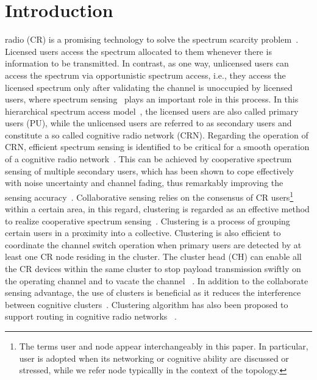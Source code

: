 \documentclass[10pt,journal,compsoc]{IEEEtran}
\theoremstyle{mytheoremstyle}
\theoremstyle{mytheoremstyle}
\theoremstyle{mytheoremstyle}
\newcommand{\ie}{i.e., }
\begin{document}
\section{Introduction}
\label{intro}
 radio (CR) is a promising technology to solve the spectrum scarcity problem~\cite{Mitola}.
Licensed users access the spectrum allocated to them whenever there is information to be transmitted.
In contrast, as one way, unlicensed users can access the spectrum via opportunistic spectrum access, \ie they access the licensed spectrum only after validating the channel is unoccupied by licensed users, where spectrum sensing~\cite{sensing_survey_2009} plays an important role in this process.
%
In this hierarchical spectrum access model~\cite{zhao_survey_DSA_2007}, the licensed users are also called primary users (PU), while the unlicensed users are referred to as secondary users and constitute a so called cognitive radio network (CRN).
%
Regarding the operation of CRN, efficient spectrum sensing is identified to be critical for a smooth operation of a cognitive radio network~\cite{Sahai_FundamentalDesignTradeoffs2006}.
This can be achieved by cooperative spectrum sensing of multiple secondary users, which has been shown to cope effectively with noise uncertainty and channel fading, thus remarkably improving the sensing accuracy~\cite{coorperativeSensing_Akyildiz11}.
Collaborative sensing relies on the consensus of CR users\footnote{The terms user and node appear interchangeably in this paper. In particular, user is adopted when its networking or cognitive ability are discussed or stressed, while we refer node typicallly in the context of the topology.} within a certain area, in this regard, clustering is regarded as an effective method to realize cooperative spectrum sensing~\cite{Sun07_clustering_spectrum_secsing, Zhao07}.
Clustering is a process of grouping certain users in a proximity into a collective.
Clustering is also efficient to coordinate the channel switch operation when primary users are detected by at least one CR node residing in the cluster.
The cluster head (CH) can enable all the CR devices within the same cluster to stop payload transmission swiftly on the operating channel and to vacate the channel ~\cite{willkomm08}.
%
In addition to the collaborate sensing advantage, the use of clusters is beneficial as it reduces the interference between cognitive clusters~\cite{centralizedSharing80222}.
Clustering algorithm has also been proposed to support routing in cognitive radio networks ~\cite{Abbasi_survey_07}.
\end{document}
